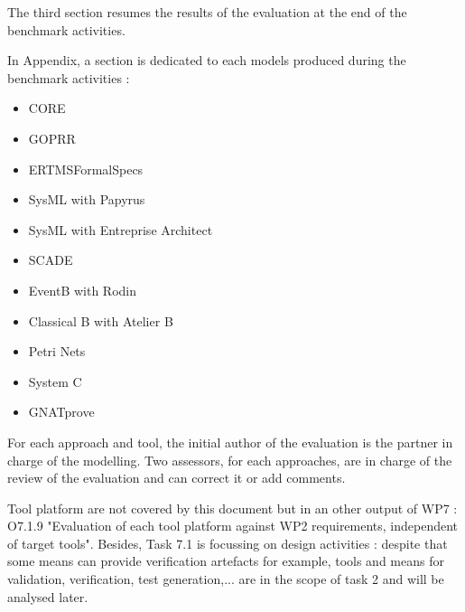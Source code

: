 The third section resumes the results of the evaluation at the end of the benchmark activities.

In Appendix, a section is dedicated to each models produced during the benchmark activities :
\begin{itemize}
\item  CORE
\item  GOPRR
\item  ERTMSFormalSpecs
\item  SysML with Papyrus
\item  SysML with Entreprise Architect
\item  SCADE
\item  EventB with Rodin
\item  Classical B with Atelier B
\item  Petri Nets
\item  System C
\item  GNATprove
\end{itemize}

For each approach and tool, the initial  author of the evaluation is the partner in charge of the modelling. Two assessors, for each approaches,  are in charge of the review of the evaluation and can correct it or add comments.

Tool platform are not covered by this document but in an other output of WP7 :  O7.1.9 "Evaluation of each tool platform against WP2 requirements, independent of target tools".
Besides, Task 7.1 is focussing on design activities : despite that some means can provide verification artefacts for example,  tools and means for validation, verification, test generation,... are in the scope of task 2 and will be analysed later.

